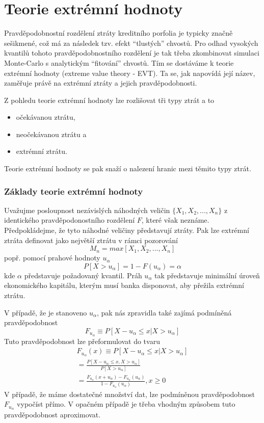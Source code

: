 \chapter{Teorie extrémní hodnoty}

Pravděpodobnostní rozdělení ztráty kreditního porfolia je typicky značně sešikmené, což má za následek tzv. efekt ``tlustých'' chvostů. Pro odhad vysokých kvantilů tohoto pravděpodobnostního rozdělení je tak třeba zkombinovat simulaci Monte-Carlo s analytickým ``fitování'' chvostů. Tím se dostáváme k teorie extrémní hodnoty (extreme value theory - EVT). Ta se, jak napovídá její název, zaměřuje právě na extrémní ztráty a jejich pravděpodobnosti.

Z pohledu teorie extrémní hodnoty lze rozlišovat tři typy ztrát a to
\begin{itemize}
\item očekávanou ztrátu,
\item neočekávanou ztrátu a
\item extrémní ztrátu.
\end{itemize}
Teorie extrémní hodnoty se pak snaží o nalezení hranic mezi těmito typy ztrát.

\subsection{Základy teorie extrémní hodnoty}

Uvažujme posloupnost nezávislých náhodných veličin $\{X_1, X_2, ..., X_n\}$ z identického pravděpodonostního rozdělení $F$, které však neznáme. Předpokládejme, že tyto náhodné veličiny představují ztráty. Pak lze extrémní ztráta definovat jako největší ztrátu v rámci pozorování
\begin{equation}
M_n = max[X_1, X_2, ..., X_n]
\end{equation}
popř. pomocí prahové hodnoty $u_{\alpha}$
\begin{equation}
P[X > u_{\alpha}] = 1 - F(u_\alpha) = \alpha
\end{equation}
kde $\alpha$ představuje požadovaný kvantil. Práh $u_{\alpha}$ tak představuje minimální úroveň ekonomického kapitálu, kterým musí banka disponovat, aby přežila extrémní ztrátu.

V případě, že je stanoveno $u_{\alpha}$, pak nás zpravidla také zajímá podmíněná pravděpodobnost
\begin{equation*}
F_{u_{\alpha}} \equiv P[X - u_{\alpha} \le x | X > u_{\alpha}]
\end{equation*}
Tuto pravděpodobnost lze přeformulovat do tvaru
\begin{multline}
F_{u_{\alpha}}(x) \equiv P[X - u_{\alpha} \le x | X > u_{\alpha}]\\
= \frac{P[X - u_{\alpha} \le x, X > u_{\alpha}]}{P[X > u_{\alpha}]}\\
= \frac{F_{u_{\alpha}}(x + u_{\alpha}) - F_{u_{\alpha}}(u_{\alpha})}{1 - F_{u_{\alpha}}(u_{\alpha})}, x \ge 0
\end{multline}
V případě, že máme dostatečné množství dat, lze podmíněnou pravděpodobnost $F_{u_{\alpha}}$ vypočíst přímo. V opačném případě je třeba vhodným způsobem tuto pravděpodobnost aproximovat.

